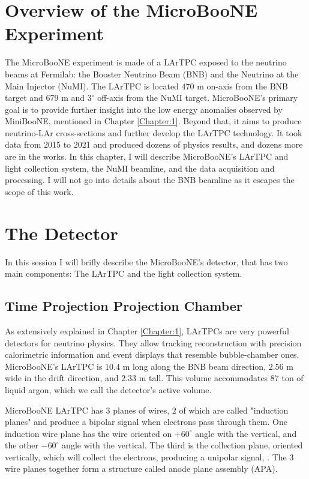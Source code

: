 \section{Overview of the MicroBooNE Experiment}
\label{Chapter:2}
The MicroBooNE experiment is made of a LArTPC exposed to the neutrino beams at Fermilab: the Booster Neutrino Beam (BNB) and the Neutrino at the Main Injector (NuMI). The LArTPC is located $470$ m on-axis from the BNB target and $679$ m and $3^{\circ}$ off-axis from the NuMI target. MicroBooNE's primary goal is to provide further insight into the low energy anomalies observed by MiniBooNE, mentioned in Chapter \ref{Chapter:1}. Beyond that, it aims to produce neutrino-LAr cross-sections and further develop the LArTPC technology. It took data from 2015 to 2021 and produced dozens of physics results, and dozens more are in the works. 
In this chapter, I will describe MicroBooNE's LArTPC and light collection system, the NuMI beamline, and the data acquisition and processing. I will not go into details about the BNB beamline as it escapes the scope of this work.

\section{The Detector}

In this session I will brifly describe the MicroBooNE's detector, that has two main components: The LArTPC and the light collection system. 
\subsection{Time Projection Projection Chamber}
As extensively explained in Chapter \ref{Chapter:1}, LArTPCs are very powerful detectors for neutrino physics. They allow tracking reconstruction with precision calorimetric information and event displays that resemble bubble-chamber ones. MicroBooNE's LArTPC is $10.4$ m long along the BNB beam direction, $2.56$ m wide in the drift direction, and $2.33$ m tall. This volume accommodates $87$ ton of liquid argon, which we call the detector's active volume.  

MicroBooNE LArTPC has $3$ planes of wires, $2$ of which are called "induction planes" and produce a bipolar signal when electrons pass through them. One induction wire plane has the wire oriented on $+60^{\circ}$ angle with the vertical, and the other $-60^{\circ}$ angle with the vertical. The third is the collection plane, oriented vertically, which will collect the electrons, producing a unipolar signal, \cite{microboone_electronics}. The $3$ wire planes together form a structure called anode plane assembly (APA). 

